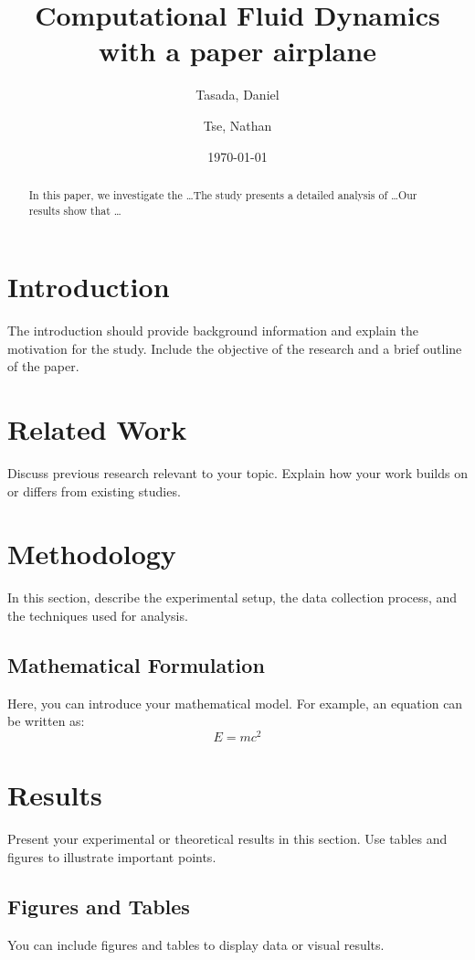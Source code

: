 \documentclass[a4paper,12pt]{article}
\title{Computational Fluid Dynamics with a paper airplane}
\author{
  Tasada, Daniel\\
  \and
  Tse, Nathan\\
}
\date{\today}
\begin{document}
\maketitle
\begin{abstract}
    In this paper, we investigate the \dots The study presents a detailed analysis of \dots Our results show that \dots
\end{abstract}

\section{Introduction}
The introduction should provide background information and explain the motivation for the study. Include the objective of the research and a brief outline of the paper.

\section{Related Work}
Discuss previous research relevant to your topic. Explain how your work builds on or differs from existing studies.

\section{Methodology}
In this section, describe the experimental setup, the data collection process, and the techniques used for analysis.

\subsection{Mathematical Formulation}
Here, you can introduce your mathematical model. For example, an equation can be written as:
\begin{equation}
    E = mc^2
\end{equation}

\section{Results}
Present your experimental or theoretical results in this section. Use tables and figures to illustrate important points.

\subsection{Figures and Tables}
You can include figures and tables to display data or visual results.
\end{document}
